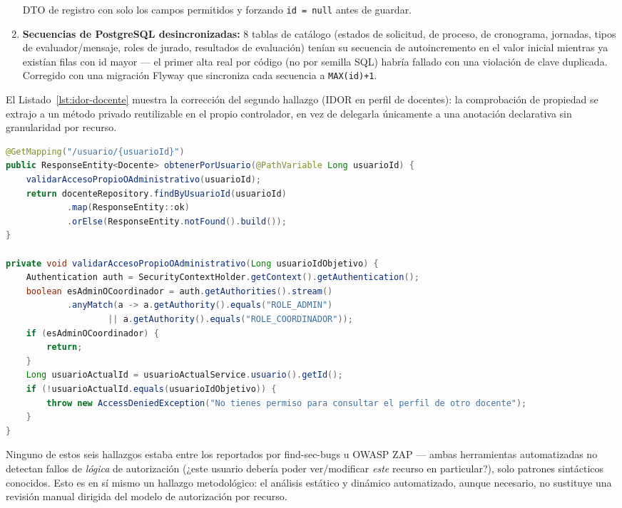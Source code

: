 \begin{enumerate}[nosep]
    DTO de registro con solo los campos permitidos y forzando \texttt{id = null} antes de guardar.
    \item \textbf{Secuencias de PostgreSQL desincronizadas:} 8 tablas de catálogo (estados de solicitud,
    de proceso, de cronograma, jornadas, tipos de evaluador/mensaje, roles de jurado, resultados de
    evaluación) tenían su secuencia de autoincremento en el valor inicial mientras ya existían filas con
    id mayor --- el primer alta real por código (no por semilla SQL) habría fallado con una violación de
    clave duplicada. Corregido con una migración Flyway que sincroniza cada secuencia a
    \texttt{MAX(id)+1}.
\end{enumerate}

El Listado~\ref{lst:idor-docente} muestra la corrección del segundo hallazgo (IDOR en perfil de
docentes): la comprobación de propiedad se extrajo a un método privado reutilizable en el propio
controlador, en vez de delegarla únicamente a una anotación declarativa sin granularidad por recurso.

\begin{lstlisting}[language=Java,style=codigobase,caption={Correccion del IDOR de \texttt{TeacherController}: verificacion de propiedad del recurso antes de exponerlo.},label={lst:idor-docente}]
@GetMapping("/usuario/{usuarioId}")
public ResponseEntity<Docente> obtenerPorUsuario(@PathVariable Long usuarioId) {
    validarAccesoPropioOAdministrativo(usuarioId);
    return docenteRepository.findByUsuarioId(usuarioId)
            .map(ResponseEntity::ok)
            .orElse(ResponseEntity.notFound().build());
}

private void validarAccesoPropioOAdministrativo(Long usuarioIdObjetivo) {
    Authentication auth = SecurityContextHolder.getContext().getAuthentication();
    boolean esAdminOCoordinador = auth.getAuthorities().stream()
            .anyMatch(a -> a.getAuthority().equals("ROLE_ADMIN")
                    || a.getAuthority().equals("ROLE_COORDINADOR"));
    if (esAdminOCoordinador) {
        return;
    }
    Long usuarioActualId = usuarioActualService.usuario().getId();
    if (!usuarioActualId.equals(usuarioIdObjetivo)) {
        throw new AccessDeniedException("No tienes permiso para consultar el perfil de otro docente");
    }
}
\end{lstlisting}

Ninguno de estos seis hallazgos estaba entre los reportados por find-sec-bugs u OWASP ZAP --- ambas
herramientas automatizadas no detectan fallos de \emph{lógica} de autorización (¿este usuario debería
poder ver/modificar \emph{este} recurso en particular?), solo patrones sintácticos conocidos. Esto es en
sí mismo un hallazgo metodológico: el análisis estático y dinámico automatizado, aunque necesario, no
sustituye una revisión manual dirigida del modelo de autorización por recurso.

